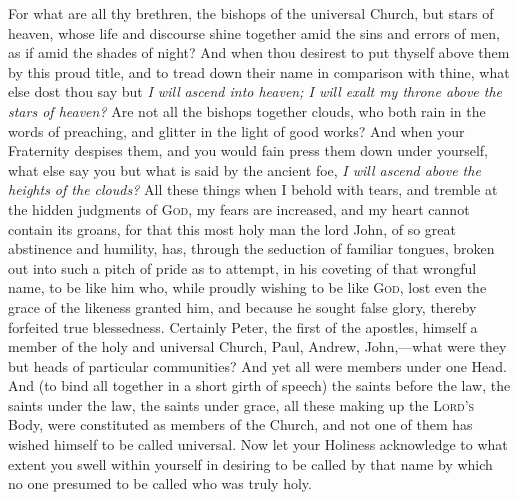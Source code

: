 For what are all thy brethren, the bishops of the universal Church, but stars of heaven, whose life and discourse shine together amid the sins and errors of men, as if amid the shades of night? And when thou desirest to put thyself above them by this proud title, and to tread down their name in comparison with thine, what else dost thou say but \emph{I will} \emph{ascend into heaven; I will exalt my throne above the stars of heaven?} Are not all the bishops together clouds, who both rain in the words of preaching, and glitter in the light of good works? And when your Fraternity despises them, and you would fain press them down under yourself, what else say you but what is said by the ancient foe, \emph{I will ascend above the heights of the clouds?} All these things when I behold with tears, and tremble at the hidden judgments of \textsc{God}, my fears are increased, and my heart cannot contain its groans, for that this most holy man the lord John, of so great abstinence and humility, has, through the seduction of familiar tongues, broken out into such a pitch of pride as to attempt, in his coveting of that wrongful name, to be like him who, while proudly wishing to be like \textsc{God}, lost even the grace of the likeness granted him, and because he sought false glory, thereby forfeited true blessedness. Certainly Peter, the first of the apostles, himself a member of the holy and universal Church, Paul, Andrew, John,—what were they but heads of particular communities? And yet all were members under one Head. And (to bind all together in a short girth of speech) the saints before the law, the saints under the law, the saints under grace, all these making up the \textsc{Lord’s} Body, were constituted as members of the Church, and not one of them has wished himself to be called universal. Now let your Holiness acknowledge to what extent you swell within yourself in desiring to be called by that name by which no one presumed to be called who was truly holy.

